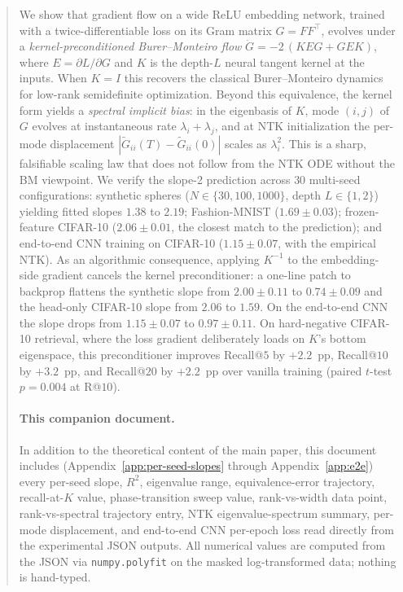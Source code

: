 \documentclass[11pt,letterpaper]{article}
\newcommand{\E}{E}
\newcommand{\Gtilde}{\widetilde{G}}
\begin{document}
\begin{abstract}
We show that gradient flow on a wide ReLU embedding network, trained with a
twice-differentiable loss on its Gram matrix $G = FF^\top$, evolves under a
\emph{kernel-preconditioned Burer--Monteiro flow}
$\dot{G} = -2\,(K\E G + G\E K)$, where $\E = \partial L/\partial G$ and $K$
is the depth-$L$ neural tangent kernel at the inputs. When $K = I$ this
recovers the classical Burer--Monteiro dynamics for low-rank semidefinite
optimization. Beyond this equivalence, the kernel form yields a
\emph{spectral implicit bias}: in the eigenbasis of $K$, mode $(i,j)$ of
$G$ evolves at instantaneous rate $\lambda_i + \lambda_j$, and at NTK
initialization the per-mode displacement $|\Gtilde_{ii}(T) - \Gtilde_{ii}(0)|$
scales as $\lambda_i^2$. This is a sharp, falsifiable scaling law that does
not follow from the NTK ODE without the BM viewpoint. We verify the
slope-2 prediction across $30$ multi-seed configurations: synthetic spheres
($N \in \{30, 100, 1000\}$, depth $L \in \{1, 2\}$) yielding fitted slopes
$1.38$ to $2.19$; Fashion-MNIST ($1.69 \pm 0.03$); frozen-feature CIFAR-10
($2.06 \pm 0.01$, the closest match to the prediction); and end-to-end CNN
training on CIFAR-10 ($1.15 \pm 0.07$, with the empirical NTK).
As an algorithmic consequence, applying $K^{-1}$ to the embedding-side
gradient cancels the kernel preconditioner: a one-line patch to backprop
flattens the synthetic slope from $2.00 \pm 0.11$ to $0.74 \pm 0.09$ and
the head-only CIFAR-10 slope from $2.06$ to $1.59$. On the end-to-end CNN
the slope drops from $1.15 \pm 0.07$ to $0.97 \pm 0.11$. On hard-negative
CIFAR-10 retrieval, where the loss gradient deliberately loads on $K$'s
bottom eigenspace, this preconditioner improves Recall@$5$ by
$+2.2$~pp, Recall@$10$ by $+3.2$~pp, and Recall@$20$ by $+2.2$~pp over
vanilla training (paired $t$-test $p = 0.004$ at R@$10$).

\paragraph{This companion document.} In addition to the theoretical content
of the main paper, this document includes (Appendix~\ref{app:per-seed-slopes}
through Appendix~\ref{app:e2e}) every per-seed slope, $R^2$, eigenvalue
range, equivalence-error trajectory, recall-at-$K$ value, phase-transition
sweep value, rank-vs-width data point, rank-vs-spectral trajectory entry,
NTK eigenvalue-spectrum summary, per-mode displacement, and end-to-end
CNN per-epoch loss read directly from the experimental JSON outputs.
All numerical values are computed from the JSON via
\texttt{numpy.polyfit} on the masked log-transformed data; nothing is
hand-typed.
\end{abstract}
\end{document}
